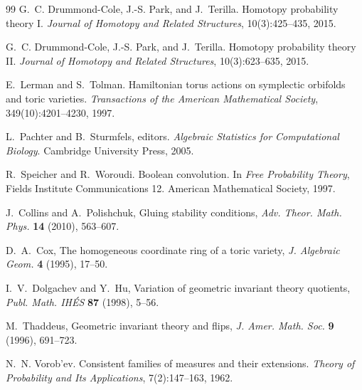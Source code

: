 \documentclass[11pt]{article}
\theoremstyle{definition}
\theoremstyle{remark}
\begin{document}
\begin{thebibliography}{99}
G.~C. Drummond-Cole, J.-S. Park, and J.~Terilla.
\newblock Homotopy probability theory {I}.
\newblock \emph{Journal of Homotopy and Related Structures}, 10(3):425--435, 2015.

G.~C. Drummond-Cole, J.-S. Park, and J.~Terilla.
\newblock Homotopy probability theory {II}.
\newblock \emph{Journal of Homotopy and Related Structures}, 10(3):623--635, 2015.

E.~Lerman and S.~Tolman.
\newblock Hamiltonian torus actions on symplectic orbifolds and toric varieties.
\newblock \emph{Transactions of the American Mathematical Society}, 349(10):4201--4230, 1997.

L.~Pachter and B.~Sturmfels, editors.
\newblock \emph{Algebraic Statistics for Computational Biology}.
\newblock Cambridge University Press, 2005.

R.~Speicher and R.~Woroudi.
\newblock Boolean convolution.
\newblock In \emph{Free Probability Theory}, Fields Institute Communications 12. American Mathematical
Society, 1997.

J.~Collins and A.~Polishchuk, Gluing stability conditions, \emph{Adv. Theor. Math. Phys.} \textbf{14} (2010), 563--607.

D.~A.~Cox, The homogeneous coordinate ring of a toric variety, \emph{J. Algebraic Geom.} \textbf{4} (1995), 17--50.

I.~V.~Dolgachev and Y.~Hu, Variation of geometric invariant theory quotients, \emph{Publ. Math. IH\'ES} \textbf{87} (1998), 5--56.

M.~Thaddeus, Geometric invariant theory and flips, \emph{J. Amer. Math. Soc.} \textbf{9} (1996), 691--723.

N.~N. Vorob'ev.
\newblock Consistent families of measures and their extensions.
\newblock \emph{Theory of Probability and Its Applications}, 7(2):147--163, 1962.

\end{thebibliography}
\end{document}
